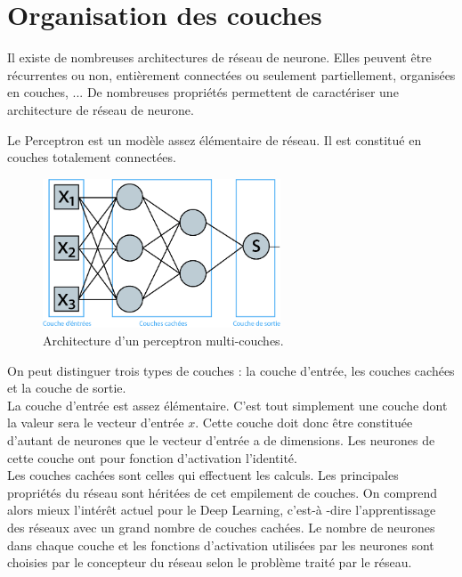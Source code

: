 \documentclass[a4paper,oneside]{report}
\begin{document}
            \section{Organisation des couches}

                Il existe de nombreuses architectures de réseau de neurone. Elles peuvent être récurrentes ou non, entièrement connectées ou seulement partiellement, organisées en couches, ... De nombreuses propriétés permettent de caractériser une architecture de réseau de neurone.

                Le Perceptron est un modèle assez élémentaire de réseau. Il est constitué en couches totalement connectées.

                \begin{figure}
                    \begin{center}
                        \includegraphics[width=200pt]{Images/perceptron-01.png}
                    \end{center}
                    \caption{Architecture d'un perceptron multi-couches.}
                \end{figure}

                On peut distinguer trois types de couches : la couche d'entrée, les couches cachées et la couche de sortie.\\

                La couche d'entrée est assez élémentaire. C'est tout simplement une couche dont la valeur sera le vecteur d'entrée $x$. Cette couche doit donc être constituée d'autant de neurones que le vecteur d'entrée a de dimensions. Les neurones de cette couche ont pour fonction d'activation l'identité.\\

                Les couches cachées sont celles qui effectuent les calculs. Les principales propriétés du réseau sont héritées de cet empilement de couches. On comprend alors mieux l'intérêt actuel pour le Deep Learning, c'est-à -dire l'apprentissage des réseaux avec un grand nombre de couches cachées.
                Le nombre de neurones dans chaque couche et les fonctions d'activation utilisées par les neurones sont choisies par le concepteur du réseau selon le problème traité par le réseau.\\
\end{document}
